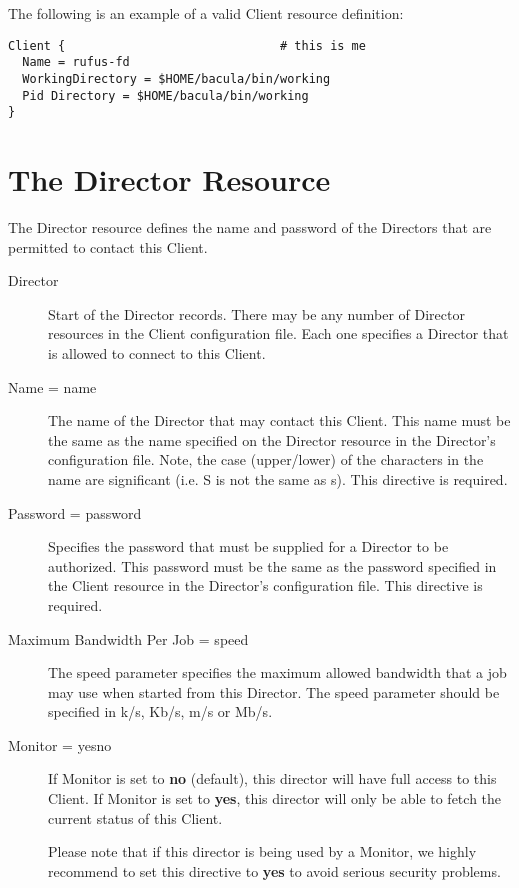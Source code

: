 The following is an example of a valid Client resource definition: 

\footnotesize
\begin{verbatim}
Client {                              # this is me
  Name = rufus-fd
  WorkingDirectory = $HOME/bacula/bin/working
  Pid Directory = $HOME/bacula/bin/working
}
\end{verbatim}
\normalsize

\section{The Director Resource}
\label{DirectorResource}

The Director resource defines the name and password of the Directors that are
permitted to contact this Client. 

\begin{description}

\item [Director]
   Start of the Director records. There may be any  number of Director resources
   in the Client configuration file. Each  one specifies a Director that is
   allowed to connect to this  Client. 

\item [Name = \lt{}name\gt{}]
   The name of the Director  that may contact this Client. This name must be the 
   same as the name specified on the Director resource  in the Director's
   configuration file. Note, the case (upper/lower) of the characters in
   the name are significant (i.e. S is not the same as s). This directive
   is required. 

\item [Password = \lt{}password\gt{}]
   Specifies the password that must be  supplied for a Director to be authorized.
This password  must be the same as the password specified in the  Client
resource in the Director's configuration file.  This directive is required. 

\item [Maximum Bandwidth Per Job = \lt{}speed\gt{}]

The speed parameter specifies the maximum allowed bandwidth that a job may use
when started from this Director. The speed parameter should be specified in
k/s, Kb/s, m/s or Mb/s.

\item [Monitor = \lt{}yes\vb{}no\gt{}]
   If Monitor is set to {\bf no} (default),  this director will have full access
   to this Client. If Monitor is set to  {\bf yes}, this director will only be
   able to fetch the current status  of this Client.

   Please note that if this director is being used by a Monitor, we highly 
   recommend to set this directive to {\bf yes} to avoid serious security 
   problems. 
\end{description}

